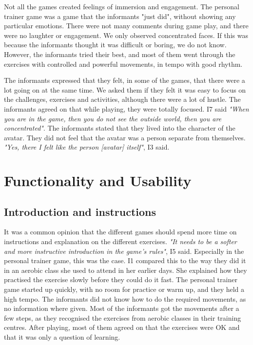 Not all the games created feelings of immersion and engagement. The personal trainer game was a game that the informants "just did", without showing any particular emotions. There were not many comments during game play, and there were no laughter or engagement. We only observed concentrated faces. If this was because the informants thought it was difficult or boring, we do not know. However, the informants tried their best, and most of them went through the exercises with controlled and powerful movements, in tempo with good rhythm.       

The informants expressed that they felt, in some of the games, that there were a lot going on at the same time. We asked them if they felt it was easy to focus on the challenges, exercises and activities, although there were a lot of hustle. The informants agreed on that while playing, they were totally focused. I7 said \emph{"When you are in the game, then you do not see the outside world, then you are concentrated"}. The informants stated that they lived into the character of the avatar. They did not feel that the avatar was a person separate from themselves. \emph{"Yes, there I felt like the person [avatar] itself"}, I3 said. 

\section{Functionality and Usability}
\subsection{Introduction and instructions}
It was a common opinion that the different games should spend more time on instructions and explanation on the different exercises. \emph{"It needs to be a softer and more instructive introduction in the game's rules"}, I5 said. Especially in  the personal trainer game, this was the case. I1 compared this to the way they did it in an aerobic class she used to attend in her earlier days. She explained how they practised the exercise slowly before they could do it fast. The personal trainer game started up quickly, with no room for practice or warm up, and they held a high tempo. The informants did not know how to do the required movements, as no information where given. Most of the informants got the movements after a few steps, as they recognised the exercises from aerobic classes in their training centres. After playing, most of them agreed on that the exercises were OK and that it was only a question of learning. 

